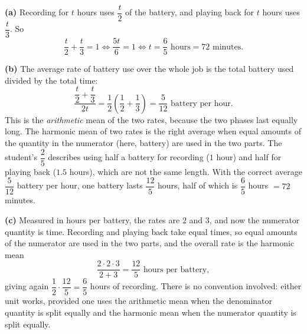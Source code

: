 \textbf{(a)} Recording for $t$ hours uses $\dfrac {t}{2}$ of the battery, and playing back for $t$ hours uses $\dfrac {t}{3}$. So
\[\dfrac {t}{2}+\dfrac {t}{3}=1\iff\dfrac{5t}{6}=1\iff t=\dfrac{6}{5}\text{ hours}=\boxed{72}\text{ minutes}.\]

\textbf{(b)} The average rate of battery use over the whole job is the total battery used divided by the total time:
\[\dfrac{\dfrac {t}{2}+\dfrac {t}{3}}{2t}=\dfrac{1}{2}\left(\dfrac{1}{2}+\dfrac{1}{3}\right)=\dfrac{5}{12}\text{ battery per hour}.\]
This is the \emph{arithmetic} mean of the two rates, because the two phases last equally long. The harmonic mean of two rates is the right average when equal amounts of the quantity in the numerator (here, battery) are used in the two parts. The student's $\dfrac{2}{5}$ describes using half a battery for recording ($1$ hour) and half for playing back ($1.5$ hours), which are not the same length. With the correct average $\dfrac{5}{12}$ battery per hour, one battery lasts $\dfrac{12}{5}$ hours, half of which is $\dfrac{6}{5}$ hours $=72$ minutes.

\textbf{(c)} Measured in hours per battery, the rates are $2$ and $3$, and now the numerator quantity is time. Recording and playing back take equal times, so equal amounts of the numerator are used in the two parts, and the overall rate is the harmonic mean
\[\dfrac{2\cdot2\cdot3}{2+3}=\dfrac{12}{5}\text{ hours per battery},\]
giving again $\dfrac{1}{2}\cdot\dfrac{12}{5}=\dfrac{6}{5}$ hours of recording. There is no convention involved: either unit works, provided one uses the arithmetic mean when the denominator quantity is split equally and the harmonic mean when the numerator quantity is split equally.
